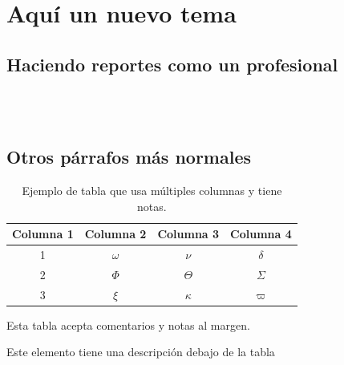 \section{Aquí un nuevo tema}

\subsection{Haciendo reportes como un profesional}


	~ \lipsum[1] \\

	\lipsum[2] \\
	\lipsum[3]


	\lipsum[1]

\subsection{Otros párrafos más normales}

	\begin{table}
		\begin{threeparttable}
		\centering
		\caption{Ejemplo de tabla que usa múltiples columnas y tiene notas.}
		\begin{tabular}{cccc}
			\hline
			\textbf{Columna 1} & \textbf{Columna 2} & \textbf{Columna 3} & \textbf{Columna 4} \bigstrut\\
			\hline
			1 & $\omega$ & $\nu$ & $\delta$ \tnote{a} \\
			2 & $\Phi$ & $\Theta$ & $\varSigma$ \\
			3 & $\xi$ & $\kappa$ & $\varpi$ \\
			\hline
		\end{tabular}
		\begin{tablenotes}
			Esta tabla acepta comentarios y notas al margen.
			\item[a] Este elemento tiene una descripción debajo de la tabla
		\end{tablenotes}
		\end{threeparttable}
	\end{table}

